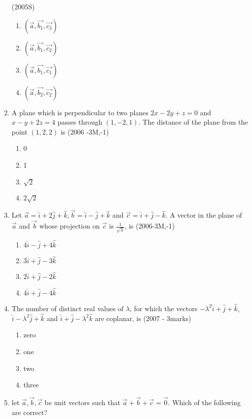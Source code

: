 \documentclass[journal,12pt,twocolumn]{IEEEtran}
\theoremstyle{remark}
\begin{document}
\begin{enumerate}
    \hfill{(2005S)}
    \begin{enumerate}[label=(\alph*)]
    \item $(\vec{a}, \vec{b_1}, \vec{c_3})$
    \item $(\vec{a}, \vec{b_1}, \vec{c_2})$
    \item $(\vec{a}, \vec{b_1}, \vec{c_1})$
    \item $(\vec{a}, \vec{b_2}, \vec{c_2})$
    \end{enumerate}
    \item A plane which is perpendicular to two planes $2x-2y+z=0$ and $x-y+2z=4$ passes through $(1,-2,1)$. The distance of the plane from the point $(1,2,2)$ is
    \hfill{(2006 -3M,-1)}
    \begin{enumerate}[label=(\alph*)]
    \item 0
    \item 1
    \item $\sqrt{2}$
    \item $2\sqrt{2}$
    \end{enumerate}
    \item Let $\vec{a} = \hat{i} + 2\hat{j} + \hat{k}, \vec{b} = \hat{i}-\hat{j}+\hat{k}$ and $\vec{c}= \hat{i}+\hat{j}-\hat{k}$. A vector in the plane of $\vec{a}$ and $\vec{b}$ whose projection on $\vec{c}$ is $\frac{1}{\sqrt{3}}$, is
    \hfill{(2006-3M,-1)}
    \begin{enumerate}[label=(\alph*)]
    \item $4\hat{i} - \hat{j} + 4\hat{k}$
    \item $3\hat{i} + \hat{j} - 3\hat{k}$
    \item $2\hat{i} + \hat{j} - 2\hat{k}$
    \item $4\hat{i} + \hat{j} - 4\hat{k}$
    \end{enumerate}
    \item The number of distinct real values of $\lambda$, for which the vectors $-\lambda^{2}\hat{i} + \hat{j} + \hat{k}$, $\hat{i} - \lambda^{2}\hat{j} + \hat{k}$ and $\hat{i} + \hat{j} - \lambda^{2}\hat{k}$ are coplanar, is
    \hfill{(2007 - 3marks)}
    \begin{enumerate}[label=(\alph*)]
    \item zero
    \item one 
    \item two 
    \item three
    \end{enumerate}
    \item let $\vec{a},\vec{b},\vec{c}$ be unit vectors such that $\vec{a}+\vec{b}+\vec{c}=\vec{0}$. Which of the following are correct?

\end{enumerate}
\end{document}
